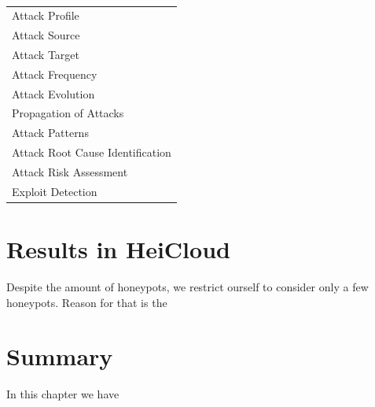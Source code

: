 \begin{table}[h]
    \centering
    \caption{}
    \begin{tabularx}{\linewidth}{l}
        \toprule
        Attack Profile\\
        Attack Source\\
        Attack Target\\
        Attack Frequency\\
        Attack Evolution\\
        Propagation of Attacks\\
        Attack Patterns\\
        Attack Root Cause Identification\\
        Attack Risk Assessment\\
        Exploit Detection\\
        \bottomrule
    \end{tabularx}
    \label{tab:overview-data-analysis}
\end{table}


\section{Results in HeiCloud}



Despite the amount of honeypots, we restrict ourself to consider only a few honeypots.
Reason for that is the 

\section{Summary}

In this chapter we have 